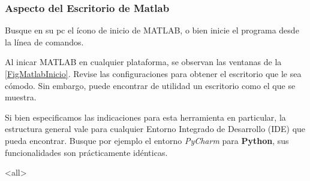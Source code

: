 \begin{frame}[label=FrameVentanaMatlab]
\frametitle<presentation>{Aspecto del Escritorio de Matlab}
\begin{figure}
\begin{center}
\end{center}
\end{figure}
 
\end{frame}

{
Busque en su pc el ícono de inicio de MATLAB, o bien inicie el programa
desde la línea de comandos. 

 Al inicar MATLAB en cualquier plataforma, se observan las ventanas de la 
 \autoref{FigMatlabInicio}. Revise las configuraciones para obtener
el escritorio que le sea cómodo. Sin embargo, puede encontrar de 
 utilidad un escritorio como el que se muestra. 

 Si bien especificamos las indicaciones para esta herramienta 
 en particular, la estructura general vale para cualquier 
  Entorno Integrado de Desarrollo (IDE) que pueda encontrar. Busque por ejemplo el entorno \emph{PyCharm} para 
  \textbf{Python}, sus funcionalidades son
  prácticamente idénticas.
}
\mode<all>

